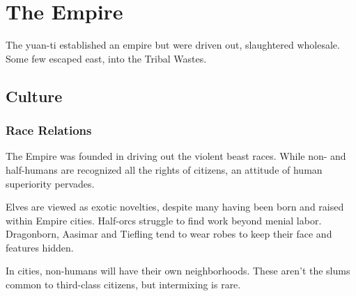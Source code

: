 \section{The Empire}

The yuan-ti established an empire but were driven out, slaughtered wholesale.
Some few escaped east, into the Tribal Wastes.

\subsection{Culture}
\subsubsection{Race Relations}
The Empire was founded in driving out the violent beast races.
While non- and half-humans are recognized all the rights of citizens, an attitude of human
 superiority pervades.

Elves are viewed as exotic novelties, despite many having been born and raised within Empire cities.
Half-orcs struggle to find work beyond menial labor.
Dragonborn, Aasimar and Tiefling tend to wear robes to keep their face and features hidden.

In cities, non-humans will have their own neighborhoods.
These aren't the slums common to third-class citizens, but intermixing is rare.
